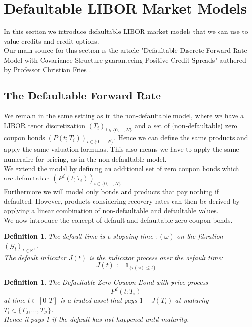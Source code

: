 \documentclass[12pt]{article}
\newtheorem{definition}[theorem]{Definition}
\begin{document}
	
	
	
	
	\pagebreak
	\section{Defaultable LIBOR Market Models}\label{sec:defaultableLMM}
	
	In this section we introduce defaultable LIBOR market models that we can use to value credits and credit options.\\
	Our main source for this section is the article "Defaultable Discrete Forward Rate Model with Covariance Structure guaranteeing Positive Credit Spreads" authored by Professor Christian Fries \cite{friesDLMM}.\\

	\subsection{The Defaultable Forward Rate}
		We remain in the same setting as in the non-defaultable model, where we have a LIBOR tenor discretization \((T_i)_{i\in\{0, ..., N\}}\) and a set of (non-defaultable) zero coupon bonds \((P(t;T_i))_{i\in\{0, ..., N\}}\). Hence we can define the same products and apply the same valuation formulas. This also means we have to apply the same numeraire for pricing, as in the non-defaultable model.\\
		We extend the model by defining an additional set of zero coupon bonds which are defaultable: \((P^d(t;T_i))_{i\in\{0, ..., N\}}\).\\
		Furthermore we will model only bonds and products that pay nothing if defaulted. However, products considering recovery rates can then be derived by applying a linear combination of non-defaultable and defaultable values.\\
		We now introduce the concept of default and defaultable zero coupon bonds.
	\begin{definition}
		The \emph{default time} is a stopping time \(\tau(\omega)\) on the filtration \((\mathcal{G}_t)_{t\in \mathbb{R}^+}\).\\
		The \emph{default indicator} \(J(t)\) is the indicator process over the default time:
		\[J(t) := \mathbf{1}_{\{\tau(\omega) \le t\}}\]
	\end{definition}
	\begin{definition}
		The \emph{Defaultable Zero Coupon Bond} with price process \[P^d(t; T_i)\] at time \(t \in \left[0, T\right]\) is a traded asset that pays \(1 - J(T_i)\) at maturity  \(T_i \in \{T_0, ..., T_N\}\).\\
		Hence it pays 1 if the default has not happened until maturity. 
	\end{definition}
\end{document}
